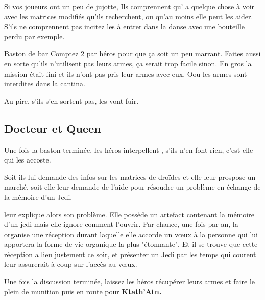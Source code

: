 Si vos joueurs ont un peu de jujotte, Ils comprennent qu’ a quelque chose à voir avec les matrices modifiés qu’ils recherchent, ou qu’au moins elle peut les aider. S’ils ne comprennent pas incitez les à entrer dans la danse avec une bouteille perdu par exemple.

\begin{paperbox}{Baston de bar}
Comptez 2  par héros pour que ça soit un peu marrant. Faites aussi en sorte qu’ils n’utilisent pas leurs armes, ça serait trop facile sinon. En gros la mission était fini et ils n’ont pas pris leur armes avec eux. Oou les armes sont interdites dans la cantina.

Au pire, s’ils s’en sortent pas, les  vont fuir.
\end{paperbox}

\subsection{Docteur et Queen}

Une fois la baston terminée, les héros interpellent , s’ils n’en font rien, c’est elle qui les accoste.

Soit ils lui demande des infos sur les matrices de droïdes et elle leur prospose un marché, soit elle leur demande de l’aide pour résoudre un problème en échange de la mémoire d’un Jedi.

 leur explique alors son problème. Elle possède un artefact contenant la mémoire d’un jedi mais elle ignore comment l’ouvrir. Par chance, une fois par an, la  organise une réception durant laquelle elle accorde un vœux à la personne qui lui apportera la forme de vie organique la plus "étonnante". Et il se trouve que cette réception a lieu justement ce soir, et présenter un Jedi par les temps qui courent leur assurerait à coup sur l’accès au vœux.

\bigbreak

Une fois la discussion terminée, laissez les héros récupérer leurs armes et faire le plein de munition puis en route pour \textbf{Ktath’Atn.}